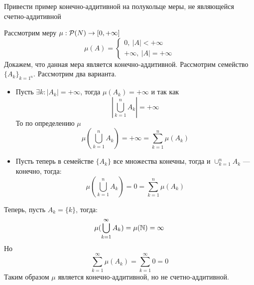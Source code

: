 \begin{task}{2}
	Привести пример конечно-аддитивной на полукольце меры, не являющейся счетно-аддитивной
\end{task}

\begin{solution}
	Рассмотрим меру $\mu: \mathcal{P}(N) \rightarrow [0, +\infty]$
	$$
	\mu(A) = 
	\begin{cases}
		0, ~|A| < +\infty \\
		+\infty, ~|A| = +\infty
	\end{cases}
	$$
	Докажем, что данная мера является конечно-аддитивной. Рассмотрим семейство $\{A_k\}_{k=1^n}$. Рассмотрим два варианта. 
	\begin{itemize}
		\item Пусть $\exists k: |A_k| = +\infty$, тогда $\mu(A_k) = +\infty$ и так как
		$$
		\left|\bigcup_{k=1}^nA_k\right| = +\infty
		$$
		То по определению $\mu$
		$$
		\mu\left(\bigcup_{k=1}^nA_k\right) = +\infty = \sum_{k=1}^{n}\mu(A_k)
		$$
		\item Пусть теперь в семействе $\{A_k\}$ все множества конечны, тогда и $\cup_{k=1}^nA_k$ --- конечно, тогда:
		$$
		\mu\left(\bigcup_{k=1}^nA_k\right) = 0 = \sum_{k=1}^n\mu(A_k)
		$$
	\end{itemize}
	Теперь, пусть $A_k = \{k\}$, тогда: 
	$$
	\mu(\bigcup_{k=1}^{\infty}A_k) = \mu(\mathbb{N}) = \infty
	$$
	Но
	$$
	\sum_{k=1}^{\infty}\mu(A_k) = \sum_{k=1}^{\infty} 0 = 0
	$$
	Таким образом $\mu$ является конечно-аддитивной, но не счетно-аддитивной.
	
\end{solution}